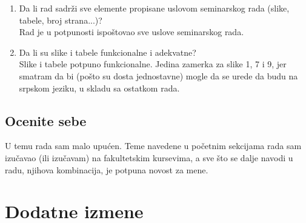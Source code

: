\documentclass[a4paper]{report}
\begin{document}
\begin{enumerate}
{Vrlo uredna struktura rada. Nakon početnih sekcija koje čitaoca upoznaju sa podtemama prelazi se na glavnu temu koja objedinjuje prethodni sadržaj.}
\item Da li rad sadrži sve elemente propisane uslovom seminarskog rada (slike, tabele, broj strana...)?\\
{Rad je u potpunosti ispoštovao sve uslove seminarskog rada.}
\item Da li su slike i tabele funkcionalne i adekvatne?\\
{Slike i tabele potpuno funkcionalne. Jedina zamerka za slike 1, 7 i 9, jer smatram da bi (pošto su dosta jednostavne) mogle da se urede da budu na srpskom jeziku, u skladu sa ostatkom rada.}
\end{enumerate}

\section{Ocenite sebe}
U temu rada sam malo upućen. Teme navedene u početnim sekcijama rada sam izučavao (ili izučavam) na fakultetskim kursevima, a sve što se dalje navodi u radu, njihova kombinacija, je potpuna novost za mene.

\chapter{Dodatne izmene}
\end{document}
